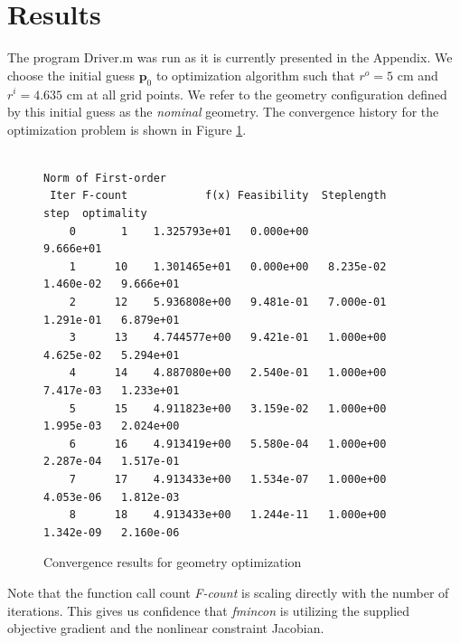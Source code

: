 \documentclass[11pt]{article}
\newcommand{\bs}[1] {\boldsymbol{#1}}
\begin{document}
\section{Results}

The program Driver.m was run as it is currently presented
in the Appendix. We choose the initial guess $\bs{p}_0$ to
optimization algorithm such that $r^o = 5$ cm and $r^i = 4.635$ cm
at all grid points. We refer to the geometry configuration defined
by this initial guess as the \emph{nominal} geometry.
The convergence history for the optimization
problem is shown in Figure \ref{fig:convergence}.

\begin{figure}[hbt!]
\small
\centering
\begin{verbatim}
                                                          Norm of First-order
 Iter F-count            f(x) Feasibility  Steplength        step  optimality
    0       1    1.325793e+01   0.000e+00                           9.666e+01
    1      10    1.301465e+01   0.000e+00   8.235e-02   1.460e-02   9.666e+01
    2      12    5.936808e+00   9.481e-01   7.000e-01   1.291e-01   6.879e+01
    3      13    4.744577e+00   9.421e-01   1.000e+00   4.625e-02   5.294e+01
    4      14    4.887080e+00   2.540e-01   1.000e+00   7.417e-03   1.233e+01
    5      15    4.911823e+00   3.159e-02   1.000e+00   1.995e-03   2.024e+00
    6      16    4.913419e+00   5.580e-04   1.000e+00   2.287e-04   1.517e-01
    7      17    4.913433e+00   1.534e-07   1.000e+00   4.053e-06   1.812e-03
    8      18    4.913433e+00   1.244e-11   1.000e+00   1.342e-09   2.160e-06
\end{verbatim}
\caption{Convergence results for geometry optimization}
\label{fig:convergence}
\end{figure}

Note that
the function call count \emph{F-count} is scaling directly
with the number of iterations. This gives us confidence that
\emph{fmincon} is utilizing the supplied objective gradient and
the nonlinear constraint Jacobian.
\end{document}

